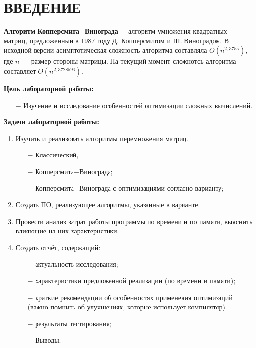 \chapter*{ВВЕДЕНИЕ}


\textbf{Алгоритм Копперсмита$-$Винограда}\cite{winograd} $-$ алгоритм умножения квадратных матриц, предложенный в 1987 году Д. Копперсмитом и Ш. Виноградом.
В исходной версии асимптотическая сложность алгоритма составляла $O(n^{2,3755})$, где  $n$ — размер стороны матрицы.
На текущий момент сложнотсь алгоритма составляет $O(n^{2,3728596})$.

\textbf{Цель лабораторной работы:}
\begin{itemize}
    \item[$-$] Изучение и исследование особенностей оптимизации сложных вычислений.
\end{itemize}

\textbf{Задачи лабораторной работы:}
\begin{enumerate}
\item Изучить и реализовать алгоритмы перемножения матриц.
\begin{enumerate}
    \item[$-$] Классический;
    \item[$-$] Копперсмита$-$Винограда;
    \item[$-$] Копперсмита$-$Винограда с оптимизациями согласно варианту;
\end{enumerate}
\item Создать ПО, реализующее алгоритмы, указанные в варианте.
\item Провести анализ затрат работы программы по времени и по памяти, выяснить влияющие на них характеристики.
    \item Создать отчёт, содержащий:
    \begin{enumerate}
        \item[$-$] актуальность исследования;
        \item[$-$] характеристики предложенной реализации (по времени и памяти);
        \item[$-$] краткие рекомендации об особенностях применения оптимизаций (важно помнить об улучшениях, которые использует компилятор).
        \item[$-$] результаты тестирования;
        \item[$-$] Выводы.
    \end{enumerate}
\end{enumerate}


